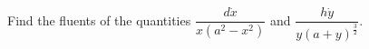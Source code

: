 Find the fluents of the quantities 
$\dfrac{d \dot{x}}{x (a^2 - x^2)}$
and
$\dfrac{h \dot{y} }{y \left(a + y \right)^{\frac{3}{2}}}$.
